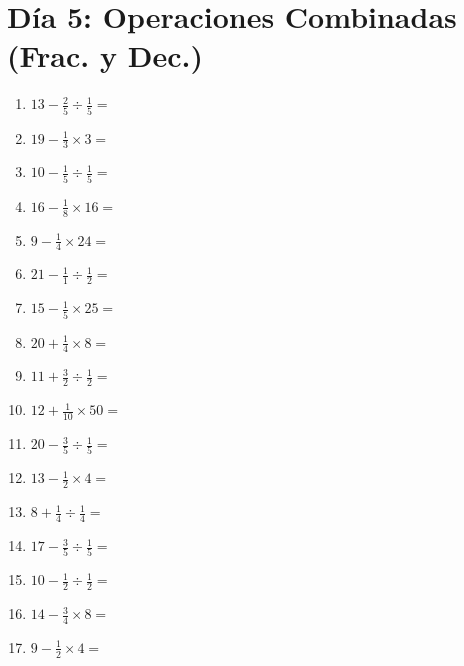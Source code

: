 \documentclass[12pt]{article}
\begin{document}
\section*{Día 5: Operaciones Combinadas (Frac. y Dec.)}
\begin{enumerate}
\item \large $ 13 - \frac{2}{5} \div \frac{1}{5} = $ \vspace{1.6cm}
\item \large $ 19 - \frac{1}{3} \times 3 = $ \vspace{1.6cm}
\item \large $ 10 - \frac{1}{5} \div \frac{1}{5} = $ \vspace{1.6cm}
\item \large $ 16 - \frac{1}{8} \times 16 = $ \vspace{1.6cm}
\item \large $ 9 - \frac{1}{4} \times 24 = $ \vspace{1.6cm}
\item \large $ 21 - \frac{1}{1} \div \frac{1}{2} = $ \vspace{1.6cm}
\item \large $ 15 - \frac{1}{5} \times 25 = $ \vspace{1.6cm}
\item \large $ 20 + \frac{1}{4} \times 8 = $ \vspace{1.6cm}
\item \large $ 11 + \frac{3}{2} \div \frac{1}{2} = $ \vspace{1.6cm}
\item \large $ 12 + \frac{1}{10} \times 50 = $ \vspace{1.6cm}
\newpage
\item \large $ 20 - \frac{3}{5} \div \frac{1}{5} = $ \vspace{1.6cm}
\item \large $ 13 - \frac{1}{2} \times 4 = $ \vspace{1.6cm}
\item \large $ 8 + \frac{1}{4} \div \frac{1}{4} = $ \vspace{1.6cm}
\item \large $ 17 - \frac{3}{5} \div \frac{1}{5} = $ \vspace{1.6cm}
\item \large $ 10 - \frac{1}{2} \div \frac{1}{2} = $ \vspace{1.6cm}
\item \large $ 14 - \frac{3}{4} \times 8 = $ \vspace{1.6cm}
\item \large $ 9 - \frac{1}{2} \times 4 = $ \vspace{1.6cm}

\end{enumerate}
\end{document}
